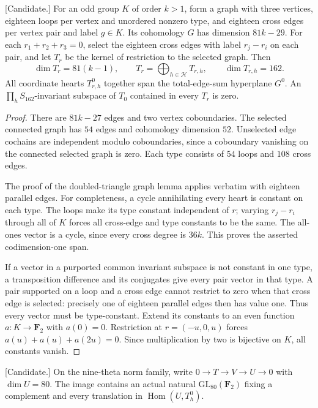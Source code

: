 \begin{lemma}
\label{lem:nine-theta-weighted-graph-candidate}
\textup{[Candidate.]}
For an odd group $K$ of order $k>1$, form a graph with three
vertices, eighteen loops per vertex and unordered nonzero type,
and eighteen cross edges per vertex pair and label $g\in K$.
Its cohomology $G$ has dimension $81k-29$. For each
$r_1+r_2+r_3=0$, select the eighteen cross edges with label
$r_j-r_i$ on each pair, and let $T_r$ be the kernel of restriction
to the selected graph. Then
\[
 \dim T_r=81(k-1),\qquad
 T_r=\bigoplus_{h\in\mathcal H}T_{r,h},\qquad
 \dim T_{r,h}=162.                              \tag{N9.2}
\]
All coordinate hearts $T_{r,h}^0$ together span the total-edge-sum
hyperplane $G^0$. An $\prod_hS_{162}$-invariant subspace of $T_0$
contained in every $T_r$ is zero.
\end{lemma}

\begin{proof}
There are $81k-27$ edges and two vertex coboundaries. The selected
connected graph has $54$ edges and cohomology dimension $52$.
Unselected edge cochains are independent modulo coboundaries,
since a coboundary vanishing on the connected selected graph is
zero. Each type consists of $54$ loops and $108$ cross edges.

The proof of the doubled-triangle graph lemma applies verbatim
with eighteen parallel edges. For completeness, a cycle annihilating
every heart is constant on each type. The loops make its type
constant independent of $r$; varying $r_j-r_i$ through all of $K$
forces all cross-edge and type constants to be the same. The
all-ones vector is a cycle, since every cross degree is $36k$.
This proves the asserted codimension-one span.

If a vector in a purported common invariant subspace is not
constant in one type, a transposition difference and its conjugates
give every pair vector in that type. A pair supported on a loop
and a cross edge cannot restrict to zero when that cross edge is
selected: precisely one of eighteen parallel edges then has value
one. Thus every vector must be type-constant. Extend its constants
to an even function $a:K\to\mathbf F_2$ with $a(0)=0$.
Restriction at $r=(-u,0,u)$ forces
$a(u)+a(u)+a(2u)=0$. Since multiplication by two is bijective on
$K$, all constants vanish.
\end{proof}

\begin{proposition}
\label{prop:nine-theta-full-gluing-candidate}
\textup{[Candidate.]}
On the nine-theta norm family, write
$0\to T\to V\to U\to0$ with $\dim U=80$.
The image contains an actual natural $\mathrm{GL}_{80}(\mathbf F_2)$
fixing a complement and every translation in $\operatorname{Hom}(U,T_h^0)$.
\end{proposition}

